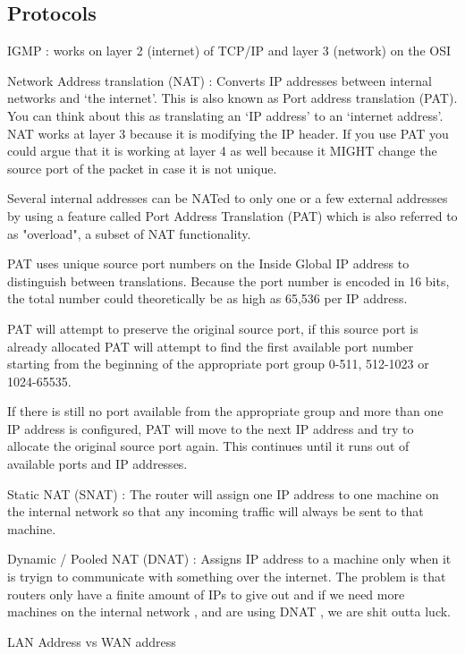 \subsectionend

\subsection{Protocols}
\label{ssec:protocols}

IGMP : works on layer 2 (internet) of TCP/IP and layer 3 (network) on the OSI 



Network Address translation (NAT) : Converts IP addresses between internal networks
and `the internet'. This is also known as Port address translation (PAT). You
can think about this as translating an `IP address' to an `internet address'.
NAT works at layer 3 because it is modifying the IP header. If you use PAT you could argue that it is working at layer 4 as well because it MIGHT change the source port of the packet in case it is not unique.



Several internal addresses can be NATed to only one or a few external
addresses by using a feature called Port Address Translation (PAT) which is
also referred to as "overload", a subset of NAT functionality.

PAT uses unique source port numbers on the Inside Global IP address to
distinguish between translations. Because the port number is encoded in 16
bits, the total number could theoretically be as high as 65,536 per IP
address.

PAT will attempt to preserve the original source port, if this source port
is already allocated PAT will attempt to find the first available port
number starting from the beginning of the appropriate port group 0-511,
512-1023 or 1024-65535.

If there is still no port available from the appropriate group and more than one
IP address is configured, PAT will move to the next IP address and try to
allocate the original source port again. This continues until it runs out of
available ports and IP addresses.



Static NAT (SNAT) : The router will assign one IP address to one machine on the
internal network so that any incoming traffic will always be sent to that
machine.

Dynamic / Pooled NAT (DNAT) : Assigns IP address to a machine only when it is
tryign to communicate with something over the internet. The problem is that
routers only have a finite amount of IPs to give out and if we need more
machines on the internal network , and are using DNAT , we are shit outta luck.

LAN Address vs WAN address



\subsectionend




\sectionend
